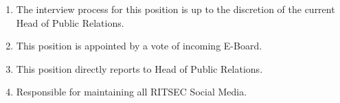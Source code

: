 
\begin{enumerate}
  \item The interview process for this position is up to the discretion of the current Head of Public Relations.
  \item This position is appointed by a vote of incoming E-Board.
  \item This position directly reports to Head of Public Relations.
  \item Responsible for maintaining all RITSEC Social Media. %
\end{enumerate}

